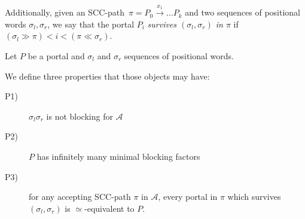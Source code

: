 \documentclass[letterpaper, USenglish, cleveref, autoref, thm-restate, numberwithinsect]{lipics-v2021}
\theoremstyle{theorem}
\theoremstyle{definition}
\newcommand{\Aa}{\mathcal{A}}
\newcommand{\equivportals}{\simeq}
\newcommand{\lefteffect}[2]{(#1 \gg #2)}
\newcommand{\righteffect}[2]{(#2 \ll #1)}
\newcommand{\SCCpath}{\pi}
\begin{document}
Additionally, given an SCC-path~$\SCCpath = P_0\xrightarrow{x_1} \ldots P_k$ and two sequences of positional words $\sigma_l, \sigma_r$, we say that the portal $P_i$ \emph{survives $(\sigma_l, \sigma_r)$ in $\SCCpath$} if $\lefteffect{\sigma_l}{\SCCpath} < i < \righteffect{\sigma_r}{\SCCpath}$.

\begin{definition}
	Let $P$ be a portal and  $\sigma_l$ and $\sigma_r$ sequences of positional words.
	
	We define three properties that those objects may have:
	\begin{description}\item[P1)] $\sigma_l \sigma_r$ is not blocking for $\Aa$
		\item[P2)] $P$ has infinitely many minimal blocking factors
		\item[P3)] for any accepting SCC-path $\SCCpath$ in $\Aa$, 
		every portal in $\SCCpath$ which survives $(\sigma_l, \sigma_r)$ is $\equivportals$-equivalent to $P$.
	\end{description}
\end{definition}
\end{document}
